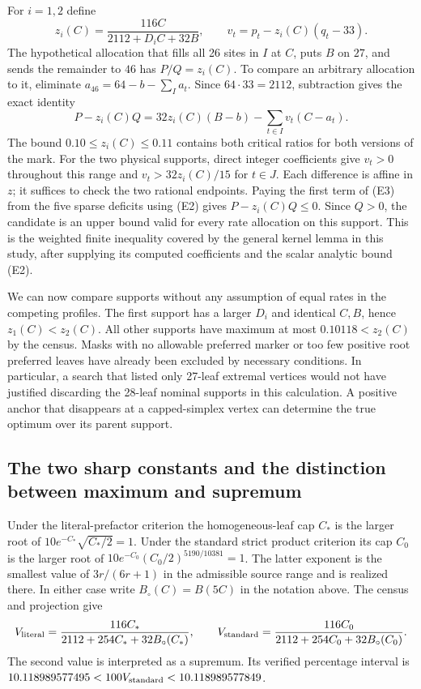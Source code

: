 \documentclass[12pt,letterpaper]{article}
\begin{document}
For \(i=1,2\) define
\[
 z_i(C)=\frac{116C}{2112+D_i C+32B},\qquad
 v_t=p_t-z_i(C)(q_t-33).
\]
The hypothetical allocation that fills all 26 sites in \(I\) at \(C\), puts \(B\) on \(27\), and sends the remainder to \(46\) has \(P/Q=z_i(C)\). To compare an arbitrary allocation to it, eliminate \(a_{46}=64-b-\sum_{I}a_t\). Since \(64\cdot33=2112\), subtraction gives the exact identity
\[
 P-z_i(C)Q
   =32z_i(C)(B-b)-\sum_{t\in I}v_t(C-a_t).
 \tag{E3}
\]
The bound \(0.10\le z_i(C)\le0.11\) contains both critical ratios for both versions of the mark. For the two physical supports, direct integer coefficients give \(v_t>0\) throughout this range and \(v_t>32z_i(C)/15\) for \(t\in J\). Each difference is affine in \(z\); it suffices to check the two rational endpoints. Paying the first term of (E3) from the five sparse deficits using (E2) gives \(P-z_i(C)Q\le0\). Since \(Q>0\), the candidate is an upper bound valid for every rate allocation on this support. This is the weighted finite inequality covered by the general kernel lemma in this study, after supplying its computed coefficients and the scalar analytic bound (E2).

We can now compare supports without any assumption of equal rates in the competing profiles. The first support has a larger \(D_i\) and identical \(C,B\), hence \(z_1(C)<z_2(C)\). All other supports have maximum at most \(0.10118<z_2(C)\) by the census. Masks with no allowable preferred marker or too few positive root preferred leaves have already been excluded by necessary conditions. In particular, a search that listed only 27-leaf extremal vertices would not have justified discarding the 28-leaf nominal supports in this calculation. A positive anchor that disappears at a capped-simplex vertex can determine the true optimum over its parent support.

\subsection{The two sharp constants and the distinction between maximum and supremum}

Under the literal-prefactor criterion the homogeneous-leaf cap \(C_*\) is the larger root of \(10 e^{-C_*}\sqrt{C_*/2}=1\). Under the standard strict product criterion its cap \(C_0\) is the larger root of \(10 e^{-C_0}(C_0/2)^{5190/10381}=1\). The latter exponent is the smallest value of \(3r/(6r+1)\) in the admissible source range and is realized there. In either case write \(B_{\circ}(C)=B(5C)\) in the notation above. The census and projection give
\[
 V_{\rm literal}=\frac{116C_*}{2112+254C_*+32B_{\circ}(C_*)},\qquad
 V_{\rm standard}=\frac{116C_0}{2112+254C_0+32B_{\circ}(C_0)}.
\]
The second value is interpreted as a supremum. Its verified percentage interval is
\(10.118989577495<100V_{\rm standard}<10.118989577849\).
\end{document}
